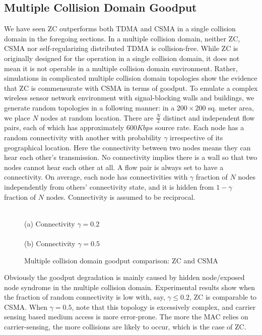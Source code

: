 \documentclass{acm_proc_article-sp}
\begin{document}
\subsection{Multiple Collision Domain Goodput}
\label{s.mc}
We have seen ZC outperforms both TDMA and CSMA in a single collision domain in the foregoing sections. In a multiple collision domain, neither ZC, CSMA nor self-regularizing distributed TDMA is collision-free. While ZC is originally designed for the operation in a single collision domain, it does not mean it is not operable in a multiple collision domain environment. Rather, simulations in complicated multiple collision domain topologies show the evidence that ZC is commensurate with CSMA in terms of goodput.
To emulate a complex wireless sensor network environment with signal-blocking walls and buildings, we generate random topologies in a following manner: in a $200 \times 200$ sq. meter area, we place $N$ nodes at random location. There are $\frac{N}{2}$ distinct and independent flow pairs, each of which has approximately $600Kbps$ source rate. Each node has a random connectivity with another with probability $\gamma$ irrespective of its geographical location. Here the connectivity between two nodes means they can hear each other's transmission. No connectivity implies there is a wall so that two nodes cannot hear each other at all. A flow pair is always set to have a connectivity. On average, each node has connectivities with $\gamma$ fraction of $N$ nodes independently from others' connectivity state, and it is hidden from $1-\gamma$ fraction of $N$ nodes. Connectivity is assumed to be reciprocal.

\begin{figure}[ht]
    \begin{center}\small
     \\ (a) Connectivity $\gamma=0.2$ \\
    \\ (b) Connectivity $\gamma=0.5$
    \normalsize
    \caption{Multiple collision domain goodput comparison: ZC and CSMA}\label{fig.mc}
    \end{center}
\vspace{-0.2in}
\end{figure}

Obviously the goodput degradation is mainly caused by hidden node/exposed node syndrome in the multiple collision domain. Experimental results show when the fraction of random connectivity is low with, say, $\gamma \le 0.2$, ZC is comparable to CSMA. When $\gamma=0.5$, note that this topology is excessively complex, and carrier sensing based medium access is more error-prone. The more the MAC relies on carrier-sensing, the more collisions are likely to occur, which is the case of ZC.
\end{document}
